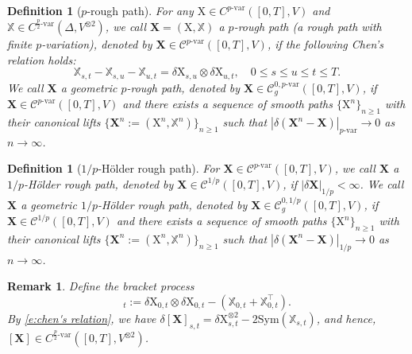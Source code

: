 \documentclass[11pt,reqno]{amsart}
\newtheorem{definition}[lemma]{Definition}
\newtheorem{remark}[lemma]{Remark}
\numberwithin{equation}{section}
\begin{document}
\begin{definition}[$p$-rough path]\label{def:rough path}
For any $\mathrm X\in C^{p\text{-}\mathrm{var}}([0,T],V)$ and  $\mathbb X\in C^{\frac{p}{2}\text{-}\mathrm{var}}(\Delta,V^{\otimes 2})$, we call $\mathbf X = (\mathrm X,\mathbb X)$ a \emph{$p$-rough path} (a rough path with finite $p$-variation), denoted by $\mathbf X\in \mathscr{C}^{p\text{-}\mathrm{var}}([0,T], V)$, if the following \emph{Chen's relation} holds:
\begin{equation}\label{e:chen's relation}
\mathbb X_{s,t} - \mathbb X_{s,u} - \mathbb X_{u,t} = \delta\mathrm X_{s,u}\otimes \delta\mathrm X_{u,t},\quad 0\le s\le u\le t\le T.
\end{equation}
We call $\mathbf X$ a \emph{geometric $p$-rough path}, denoted by $\mathbf X\in \mathscr{C}^{0,p\text{-}\mathrm{var}}_{g}([0,T],V)$,  if $\mathbf X \in \mathscr{C}^{p\text{-}\mathrm{var}}([0,T],V)$ and there exists a sequence of smooth paths $\{\mathrm X^n\}_{n\ge 1}$ with their canonical lifts $\{\mathbf X^n:=(\mathrm X^n , \mathbb X^n)\}_{n\ge 1} $ such that $|\delta( \mathbf X^n - \mathbf X) |_{p\text{-}\mathrm{var}}\to 0$ as $n\to \infty$.
\end{definition}

\begin{definition}[$1/p$-H\"older rough path]\label{def:Holde rough path}
For $\mathbf X \in \mathscr C^{p\text{-}\mathrm{var}}([0,T],V)$, we call $\mathbf X$ a $1/p$-\emph{H\"older} rough path, denoted by $\mathbf X \in \mathscr C^{1/p}([0,T],V)$, if $|\delta \mathbf X|_{1/p} < \infty$. We call $\mathbf X$ a geometric $1/p$-\emph{H\"older} rough path, denoted by $\mathbf X \in \mathscr C^{0,1/p}_g([0,T],V)$, if $\mathbf X \in \mathscr C^{1/p}([0,T],V)$ and there exists a sequence of smooth paths $\{\mathrm X^n\}_{n\ge 1}$ with their canonical lifts $\{\mathbf X^n:=(\mathrm X^n , \mathbb X^n)\}_{n\ge 1} $ such that $|\delta( \mathbf X^n - \mathbf X) |_{1/p}\to 0$ as $n\to \infty$. 
\end{definition}

\begin{remark}\label{rem:chen's relation}
Define the bracket process
\begin{equation*}
[\mathbf X]_{t} := \delta \mathrm X_{0,t}\otimes \delta \mathrm X_{0,t}- \left(\mathbb X_{0,t} + \mathbb X^{\top}_{0,t} \right).
\end{equation*}
By \eqref{e:chen's relation}, we have $\delta[\mathbf X]_{s,t} =  \delta \mathrm X_{s,t}^{\otimes2}-2 \mathrm{Sym}(\mathbb X_{s,t})$, and hence, $[\mathbf X]\in C^{\frac{p}{2}\text{-}\mathrm{var}}([0,T],V^{\otimes 2})$. 
\end{remark}
\end{document}
